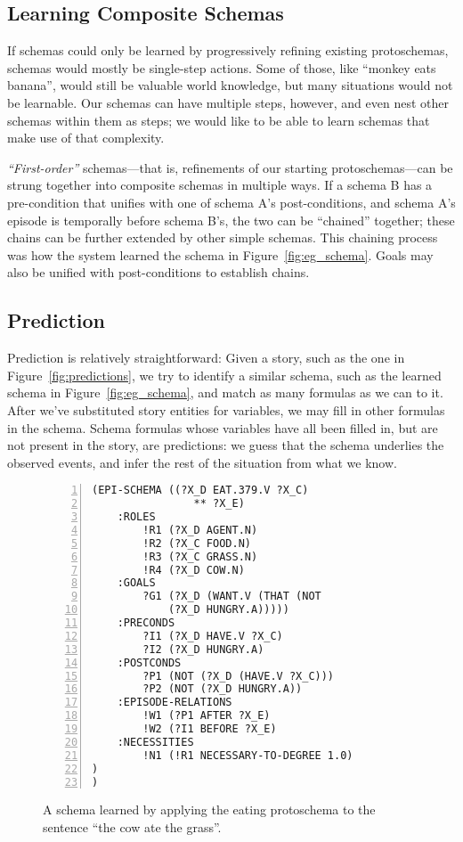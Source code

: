 \subsection{Learning Composite Schemas}
If schemas could only be learned by progressively refining existing protoschemas, schemas would mostly be single-step actions. Some of those, like ``monkey eats banana'', would still be valuable world knowledge, but many situations would not be learnable. Our schemas can have multiple steps, however, and even nest other schemas within them as steps; we would like to be able to learn schemas that make use of that complexity.

\textit{``First-order''} schemas---that is, refinements of our starting protoschemas---can be strung together into composite schemas in multiple ways. If a schema B has a pre-condition that unifies with one of schema A's post-conditions, and schema A's episode is temporally before schema B's, the two can be ``chained'' together; these chains can be further extended by other simple schemas. This chaining process was how the system learned the schema in Figure~\ref{fig:eg_schema}. Goals may also be unified with post-conditions to establish chains.

\subsection{Prediction}
Prediction is relatively straightforward: Given a story, such as the one in Figure~\ref{fig:predictions}, we try to identify a similar schema, such as the learned schema in Figure~\ref{fig:eg_schema}, and match as many formulas as we can to it. After we've substituted story entities for variables, we may fill in other formulas in the schema. Schema formulas whose variables have all been filled in, but are not present in the story, are predictions: we guess that the schema underlies the observed events, and infer the rest of the situation from what we know.

\begin{figure}[htbp]
    \begin{lstlisting}[frame=single,numbers=left,numberstyle=\tiny,xleftmargin=1.5em,style=Schemas]
(EPI-SCHEMA ((?X_D EAT.379.V ?X_C)
                ** ?X_E)
	:ROLES
		!R1 (?X_D AGENT.N)
		!R2 (?X_C FOOD.N)
		!R3 (?X_C GRASS.N)
		!R4 (?X_D COW.N)
	:GOALS
		?G1 (?X_D (WANT.V (THAT (NOT
		    (?X_D HUNGRY.A)))))
	:PRECONDS
		?I1 (?X_D HAVE.V ?X_C)
		?I2 (?X_D HUNGRY.A)
	:POSTCONDS
		?P1 (NOT (?X_D (HAVE.V ?X_C)))
		?P2 (NOT (?X_D HUNGRY.A))
	:EPISODE-RELATIONS
		!W1 (?P1 AFTER ?X_E)
		!W2 (?I1 BEFORE ?X_E)
	:NECESSITIES
		!N1 (!R1 NECESSARY-TO-DEGREE 1.0)
)
)\end{lstlisting}
    \caption{A schema learned by applying the eating protoschema to the sentence ``the cow ate the grass''.}
    \label{fig:rematch_1}
\end{figure}

